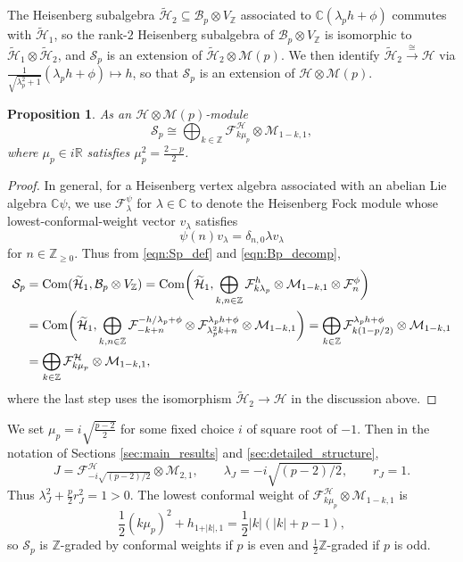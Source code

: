 \documentclass[11pt, reqno]{amsart}
\newtheorem{prop}[thm]{Proposition}
\theoremstyle{definition}\newtheorem{defi}[thm]{Definition}
\theoremstyle{definition}\newtheorem{rem}[thm]{Remark}
\theoremstyle{definition}\newtheorem{exam}[thm]{Example}
\theoremstyle{definition}\newtheorem{assum}[thm]{Assumption}
\newcommand{\cB}{\mathcal{B}}
\newcommand{\cH}{\mathcal{H}}
\newcommand{\cM}{\mathcal{M}}
\newcommand{\cS}{\mathcal{S}}
\newcommand{\cF}{\mathcal{F}}
\newcommand{\til}{\widetilde}
\newcommand{\CC}{\mathbb{C}}
\newcommand{\ZZ}{\mathbb{Z}}
\begin{document}
 The Heisenberg  subalgebra $\til{\cH}_2\subseteq\cB_p\otimes V_\ZZ$ associated to $\CC(\lambda_p h+\phi)$ commutes with $\til{\cH}_1$, so the rank-$2$ Heisenberg subalgebra of $\cB_p\otimes V_\ZZ$ is isomorphic to $\til{\cH}_1\otimes\til{\cH}_2$, and $\cS_p$ is an extension of $\til{\cH}_2\otimes\cM(p)$. We then identify $\til{\cH}_2\xrightarrow{\cong}\cH$ via $\frac{1}{\sqrt{\lambda_p^2+1}}(\lambda_p h+\phi)\mapsto h$, so that $\cS_p$ is an extension of $\cH\otimes\cM(p)$.
\begin{prop}\label{prop:Sp_decomp}
As an $\cH\otimes\cM(p)$-module
\begin{equation}\label{eqn:Sp_decomp}
\mathcal{S}_p \cong \bigoplus_{k \in \ZZ} \cF^\cH_{k\mu_p} \otimes \cM_{1-k,1},
\end{equation}
where $\mu_p \in i\mathbb{R}$ satisfies $\mu_p^2 = \frac{2-p}{2}$. 
\end{prop}
\begin{proof}
In general, for a Heisenberg vertex algebra associated with an abelian Lie algebra $\CC\psi$, we use $\cF^\psi_\lambda$ for $\lambda\in\CC$ to denote the Heisenberg Fock module whose lowest-conformal-weight vector $v_\lambda$ satisfies
\begin{equation*}
\psi(n)v_\lambda = \delta_{n,0}\lambda v_\lambda
\end{equation*}
for $n\in\ZZ_{\geq 0}$. Thus from \eqref{eqn:Sp_def} and \eqref{eqn:Bp_decomp},
\begin{align*}
\cS_p &= {\rm Com}(\widetilde{\cH}_1, \cB_p \otimes V_{\ZZ})= {\rm Com}\bigg(\widetilde{\cH}_1,\bigoplus_{k,n \in \ZZ} \cF_{k\lambda_p}^h \otimes \cM_{1-k,1} \otimes \cF^{\phi}_n\bigg)\\
&= {\rm Com}\bigg(\widetilde{\cH}_1,\bigoplus_{k,n \in \ZZ} \cF_{-k+n}^{-h/\lambda_p+\phi} \otimes \cF^{\lambda_p h+\phi}_{\lambda_p^2 k+n}\otimes \cM_{1-k,1}\bigg)= \bigoplus_{k \in \ZZ} \cF^{\lambda_p h+\phi}_{k(1-p/2)} \otimes \cM_{1-k,1} \\
&=\bigoplus_{k \in \ZZ} \cF^\cH_{k\mu_p} \otimes \cM_{1-k,1},
\end{align*}
where the last step uses the isomorphism $\til{\cH}_2\rightarrow\cH$ in the discussion above.
\end{proof}

We set $\mu_p=i\sqrt{\frac{p-2}{2}}$ for some fixed choice $i$ of square root of $-1$. Then in the notation of Sections \ref{sec:main_results} and \ref{sec:detailed_structure}, 
\begin{equation*}
J=\cF^\cH_{-i\sqrt{(p-2)/2}}\otimes\cM_{2,1},\qquad\lambda_J=-i\sqrt{(p-2)/2},\qquad r_J=1.
\end{equation*}
Thus $\lambda_J^2+\frac{p}{2} r_J^2 =1>0$. The lowest conformal weight of $\cF^\cH_{k\mu_p} \otimes \cM_{1-k,1}$ is
\begin{equation*}
\frac{1}{2}(k\mu_p)^2 + h_{1+\vert k\vert,1}=\frac{1}{2}\vert k\vert(\vert k\vert+p-1),
\end{equation*}
so $\mathcal{S}_p$ is $\ZZ$-graded by conformal weights if $p$ is even and $\frac{1}{2}\ZZ$-graded if $p$ is odd.
\end{document}
